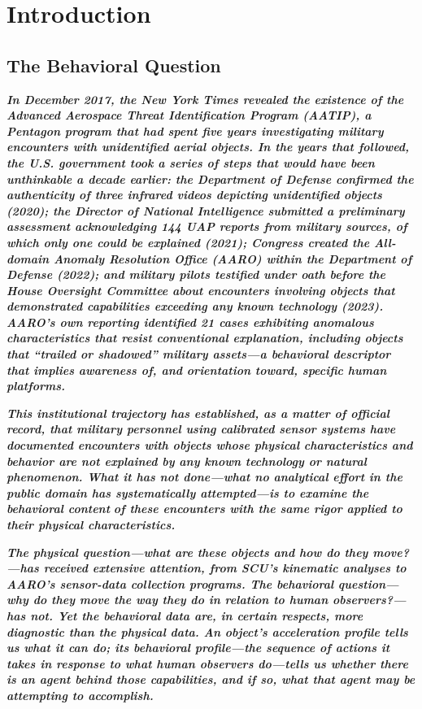 \documentclass[11pt,letterpaper]{article}
\begin{document}
\tableofcontents
\newpage


\section{Introduction}

\subsection{The Behavioral Question}

\textbf{\textit{In December 2017, the New York Times revealed the existence of the Advanced Aerospace Threat Identification Program (AATIP), a Pentagon program that had spent five years investigating military encounters with unidentified aerial objects. In the years that followed, the U.S. government took a series of steps that would have been unthinkable a decade earlier: the Department of Defense confirmed the authenticity of three infrared videos depicting unidentified objects (2020); the Director of National Intelligence submitted a preliminary assessment acknowledging 144 UAP reports from military sources, of which only one could be explained (2021); Congress created the All-domain Anomaly Resolution Office (AARO) within the Department of Defense (2022); and military pilots testified under oath before the House Oversight Committee about encounters involving objects that demonstrated capabilities exceeding any known technology (2023). AARO's own reporting identified 21 cases exhibiting anomalous characteristics that resist conventional explanation, including objects that ``trailed or shadowed'' military assets---a behavioral descriptor that implies awareness of, and orientation toward, specific human platforms.}}


\textbf{\textit{This institutional trajectory has established, as a matter of official record, that military personnel using calibrated sensor systems have documented encounters with objects whose physical characteristics and behavior are not explained by any known technology or natural phenomenon. What it has not done---what no analytical effort in the public domain has systematically attempted---is to examine the }}\textbf{\textit{behavioral content}}\textbf{\textit{ of these encounters with the same rigor applied to their physical characteristics.}}


\textbf{\textit{The physical question---what are these objects and how do they move?---has received extensive attention, from SCU's kinematic analyses to AARO's sensor-data collection programs. The behavioral question---why do they move the way they do in relation to human observers?---has not. Yet the behavioral data are, in certain respects, more diagnostic than the physical data. An object's acceleration profile tells us what it can do; its behavioral profile---the sequence of actions it takes in response to what human observers do---tells us whether there is an agent behind those capabilities, and if so, what that agent may be attempting to accomplish.}}
\end{document}
